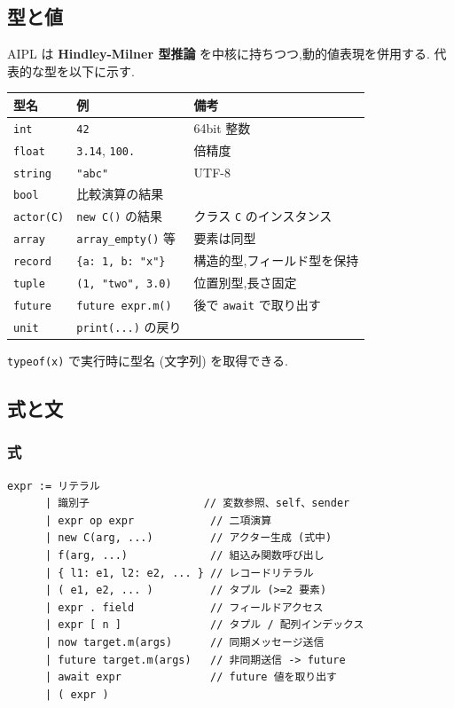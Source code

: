 \documentclass[11pt,a4paper]{article}
\begin{document}
\subsection{型と値}

AIPL は \textbf{Hindley-Milner 型推論} を中核に持ちつつ,動的値表現を併用する.
代表的な型を以下に示す.

\begin{center}
\begin{tabular}{lll}
\toprule
型名 & 例 & 備考 \\
\midrule
\texttt{int} & \texttt{42} & 64bit 整数 \\
\texttt{float} & \texttt{3.14}, \texttt{100.} & 倍精度 \\
\texttt{string} & \texttt{"abc"} & UTF-8 \\
\texttt{bool} & 比較演算の結果 & \\
\texttt{actor(C)} & \texttt{new C()} の結果 & クラス \texttt{C} のインスタンス \\
\texttt{array} & \texttt{array\_empty()} 等 & 要素は同型 \\
\texttt{record} & \texttt{\{a: 1, b: "x"\}} & 構造的型,フィールド型を保持 \\
\texttt{tuple} & \texttt{(1, "two", 3.0)} & 位置別型,長さ固定 \\
\texttt{future} & \texttt{future expr.m()} & 後で \texttt{await} で取り出す \\
\texttt{unit} & \texttt{print(...)} の戻り & \\
\bottomrule
\end{tabular}
\end{center}

\texttt{typeof(x)} で実行時に型名 (文字列) を取得できる.

\subsection{式と文}

\subsubsection*{式}

\begin{lstlisting}
expr := リテラル
      | 識別子                  // 変数参照、self、sender
      | expr op expr            // 二項演算
      | new C(arg, ...)         // アクター生成 (式中)
      | f(arg, ...)             // 組込み関数呼び出し
      | { l1: e1, l2: e2, ... } // レコードリテラル
      | ( e1, e2, ... )         // タプル (>=2 要素)
      | expr . field            // フィールドアクセス
      | expr [ n ]              // タプル / 配列インデックス
      | now target.m(args)      // 同期メッセージ送信
      | future target.m(args)   // 非同期送信 -> future
      | await expr              // future 値を取り出す
      | ( expr )
\end{lstlisting}
\end{document}

